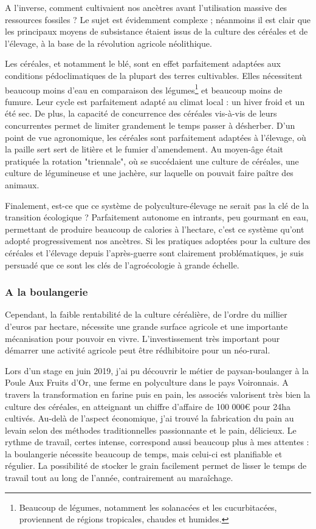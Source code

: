 \documentclass{book}
\begin{document}
A l'inverse, comment cultivaient nos ancètres avant l'utilisation massive des ressources fossiles ? Le sujet est évidemment complexe ; néanmoins il est clair que les principaux moyens de subsistance étaient issus de la culture des céréales et de l'élevage, à la base de la révolution agricole néolithique.

Les céréales, et notamment le blé, sont en effet parfaitement adaptées aux conditions pédoclimatiques de la plupart des terres cultivables. Elles nécessitent beaucoup moins d'eau en comparaison des légumes\footnote{Beaucoup de légumes, notamment les solanacées et les cucurbitacées, proviennent de régions tropicales, chaudes et humides.} et beaucoup moins de fumure. Leur cycle est parfaitement adapté au climat local : un hiver froid et un été sec. De plus, la capacité de concurrence des céréales vis-à-vis de leurs concurrentes permet de limiter grandement le temps passer à désherber. D'un point de vue agronomique, les céréales sont parfaitement adaptées à l'élevage, où la paille sert sert de litière et le fumier d'amendement. Au moyen-âge était pratiquée la rotation "triennale", où se succédaient une culture de céréales, une culture de légumineuse et une jachère, sur laquelle on pouvait faire paître des animaux.

Finalement, est-ce que ce système de polyculture-élevage ne serait pas la clé de la transition écologique ? Parfaitement autonome en intrants, peu gourmant en eau, permettant de produire beaucoup de calories à l'hectare, c'est ce système qu'ont adopté progressivement nos ancètres. Si les pratiques adoptées pour la culture des céréales et l'élevage depuis l'après-guerre sont clairement problématiques, je suis persuadé que ce sont les clés de l'agroécologie à grande échelle. 

\subsubsection{A la boulangerie}

Cependant, la faible rentabilité de la culture céréalière, de l'ordre du millier d'euros par hectare, nécessite une grande surface agricole et une importante mécanisation pour pouvoir en vivre. L'investissement très important pour démarrer une activité agricole peut être rédhibitoire pour un néo-rural. 

Lors d'un stage en juin 2019, j'ai pu découvrir le métier de paysan-boulanger à la Poule Aux Fruits d'Or, une ferme en polyculture dans le pays Voironnais. A travers la transformation en farine puis en pain, les associés valorisent très bien la culture des céréales, en atteignant un chiffre d'affaire de 100 000\euro{} pour 24ha cultivés. Au-delà de l'aspect économique, j'ai trouvé la fabrication du pain au levain selon des méthodes traditionnelles passionnante et le pain, délicieux. Le rythme de travail, certes intense, correspond aussi beaucoup plus à mes attentes : la boulangerie nécessite beaucoup de temps, mais celui-ci est planifiable et régulier. La possibilité de stocker le grain facilement permet de lisser le temps de travail tout au long de l'année, contrairement au maraîchage. 
\end{document}
